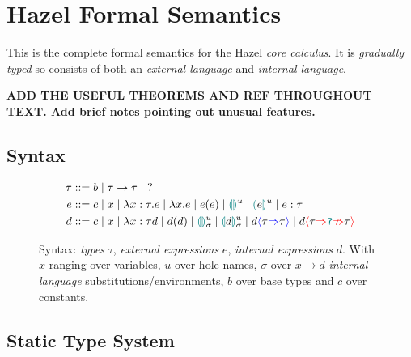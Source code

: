 \chapter{Hazel Formal Semantics}
\label{sec:HazelSemantics}
This is the complete formal semantics for the Hazel \textit{core calculus}. It is \textit{gradually typed} so consists of both an \textit{external language} and \textit{internal language}.

\textbf{ADD THE USEFUL THEOREMS AND REF THROUGHOUT TEXT. Add brief notes pointing out unusual features.}

\section{Syntax}
\begin{figure}[h]
\begin{align*}
\tau &::= b \mid \tau \to \tau \mid\  ?\\
e &::= c \mid x \mid \lambda x : \tau.e \mid \lambda x. e \mid e(e) \mid \hole^u \mid \hole[e]^u \mid e : \tau\\
d &::= c \mid x \mid \lambda x : \tau d \mid d(d) \mid \hole^u_\sigma \mid \hole[d]^u_\sigma \mid d\scast{\tau}{\tau} \mid d\scasterror{\tau}{\tau}
\end{align*}
\caption{Syntax: \textit{types} $\tau$, \textit{external expressions} $e$, \textit{internal expressions} $d$. With $x$ ranging over variables, $u$ over hole names, $\sigma$ over $x \to d$ \textit{internal language} substitutions/environments, $b$ over base types and $c$ over constants.}
\label{fig:syntaxappendix}
\end{figure}

\section{Static Type System}
